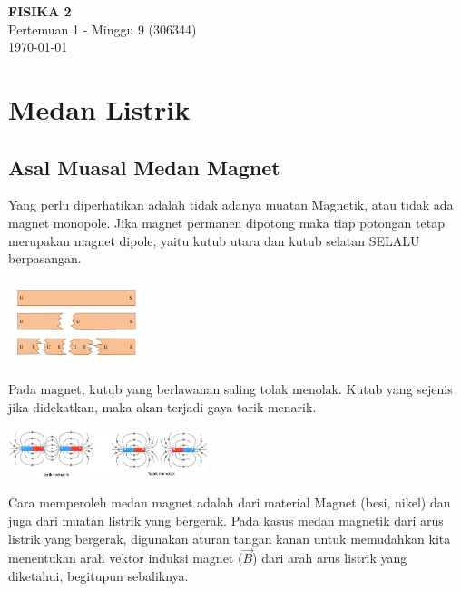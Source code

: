 \documentclass[twocolumn, 11pt]{article}%
\begin{document}
\begin{strip}
  \vspace*{\dimexpr-\stripsep}
  \begin{center}
      \Large\textbf{FISIKA 2}\\
      \large{Pertemuan 1 - Minggu 9 (306344)}\\
      \large{\today}
   \end{center}
\end{strip}

\section{Medan Listrik}
\subsection{Asal Muasal Medan Magnet}%
    Yang perlu diperhatikan adalah tidak adanya muatan Magnetik, atau
    tidak ada magnet monopole. Jika magnet permanen dipotong maka tiap
    potongan tetap merupakan magnet dipole, yaitu kutub utara dan kutub
    selatan SELALU berpasangan.
    \begin{center}
        \includegraphics[width=150px]{1.png}
    \end{center}

    Pada magnet, kutub yang berlawanan saling tolak menolak. Kutub yang
    sejenis jika didekatkan, maka akan terjadi gaya tarik-menarik.

    \begin{center}
        \includegraphics[width=220px]{2.png}
    \end{center}

    Cara memperoleh medan magnet adalah dari material Magnet (besi,
    nikel) dan juga dari muatan listrik yang bergerak. Pada kasus medan
    magnetik dari arus listrik yang bergerak, digunakan aturan tangan
    kanan untuk memudahkan kita menentukan arah vektor induksi magnet
    ($\vec B$) dari arah arus listrik yang diketahui, begitupun
    sebaliknya.
\end{document}
